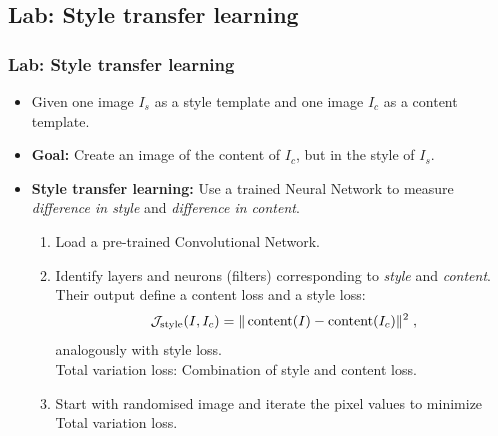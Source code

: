 \documentclass[10pt,hyperref={pdfpagelabels=false}]{beamer}
\begin{document}
\subsection{Lab: Style transfer learning}
\begin{frame}[allowframebreaks]
    \frametitle{Lab: Style transfer learning}
    \begin{itemize}
        \item Given one image $I_s$ as a style template and one image $I_c$ as a content template.
        \item {\bf Goal:} Create an image of the content of $I_c$, but in the style of $I_s$.
        \framebreak
        \item {\bf Style transfer learning:} Use a trained Neural Network to measure \emph{difference in style} and \emph{difference in content}.
        \begin{enumerate}
            \item Load a pre-trained Convolutional Network.
            \item Identify layers and neurons (filters) corresponding to \emph{style} and \emph{content}. \\
            Their output define a content loss and a style loss:
            $$
                \mathcal{J}_{\text{style}}(I, I_c) = \|\operatorname{content}(I)-\operatorname{content}(I_c)\|^2\;,
            $$
            analogously with style loss.\\
            Total variation loss: Combination of style and content loss.
            \item Start with randomised image and iterate the pixel values to minimize Total variation loss.
        \end{enumerate}
    \end{itemize}
\end{frame}
\end{document}
